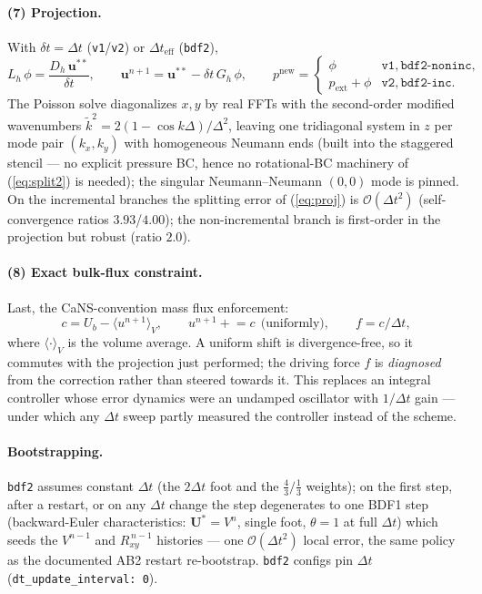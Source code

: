 \documentclass[11pt,a4paper]{article}
\newcommand{\bu}{\mathbf{u}}
\newcommand{\bU}{\mathbf{U}}
\begin{document}
\paragraph{(7) Projection.} With $\delta t=\Delta t$
(\texttt{v1}/\texttt{v2}) or $\Delta t_{\mathrm{eff}}$ (\texttt{bdf2}),
\begin{equation}
L_h\,\phi = \frac{D_h\,\bu^{**}}{\delta t},
\qquad
\bu^{n+1} = \bu^{**} - \delta t\,G_h\,\phi,
\qquad
p^{\mathrm{new}} =
\begin{cases}
\phi & \texttt{v1}, \texttt{bdf2-noninc},\\
p_{\mathrm{ext}}+\phi & \texttt{v2}, \texttt{bdf2-inc}.
\end{cases}
\label{eq:proj}
\end{equation}
The Poisson solve diagonalizes $x,y$ by real FFTs with the second-order
modified wavenumbers $\tilde k^{2}=2(1-\cos k\Delta)/\Delta^{2}$, leaving one
tridiagonal system in $z$ per mode pair $(k_x,k_y)$ with homogeneous Neumann
ends (built into the staggered stencil --- no explicit pressure BC, hence no
rotational-BC machinery of (\ref{eq:split2}) is needed); the singular
Neumann--Neumann $(0,0)$ mode is pinned. On the incremental branches the
splitting error of (\ref{eq:proj}) is $\mathcal O(\Delta t^{2})$
(self-convergence ratios $3.93$/$4.00$); the non-incremental branch is
first-order in the projection but robust (ratio $2.0$).

\paragraph{(8) Exact bulk-flux constraint.} Last, the CaNS-convention mass
flux enforcement:
\begin{equation}
c = U_b - \langle u^{n+1}\rangle_V,
\qquad
u^{n+1} \mathrel{+}= c \ \ \text{(uniformly)},
\qquad
f = c/\Delta t,
\label{eq:flux}
\end{equation}
where $\langle\cdot\rangle_V$ is the volume average. A uniform shift is
divergence-free, so it commutes with the projection just performed; the
driving force $f$ is \emph{diagnosed} from the correction rather than steered
towards it. This replaces an integral controller whose error dynamics were an
undamped oscillator with $1/\Delta t$ gain --- under which any $\Delta t$
sweep partly measured the controller instead of the scheme.

\paragraph{Bootstrapping.} \texttt{bdf2} assumes constant $\Delta t$ (the
$2\Delta t$ foot and the $\tfrac43/\tfrac13$ weights); on the first step,
after a restart, or on any $\Delta t$ change the step degenerates to one BDF1
step (backward-Euler characteristics: $\bU^{*}=V^{n}$, single foot,
$\theta=1$ at full $\Delta t$) which seeds the $V^{n-1}$ and $R_{xy}^{\,n-1}$
histories --- one $\mathcal O(\Delta t^{2})$ local error, the same policy as
the documented AB2 restart re-bootstrap. \texttt{bdf2} configs pin
$\Delta t$ (\texttt{dt\_update\_interval:~0}).
\end{document}
